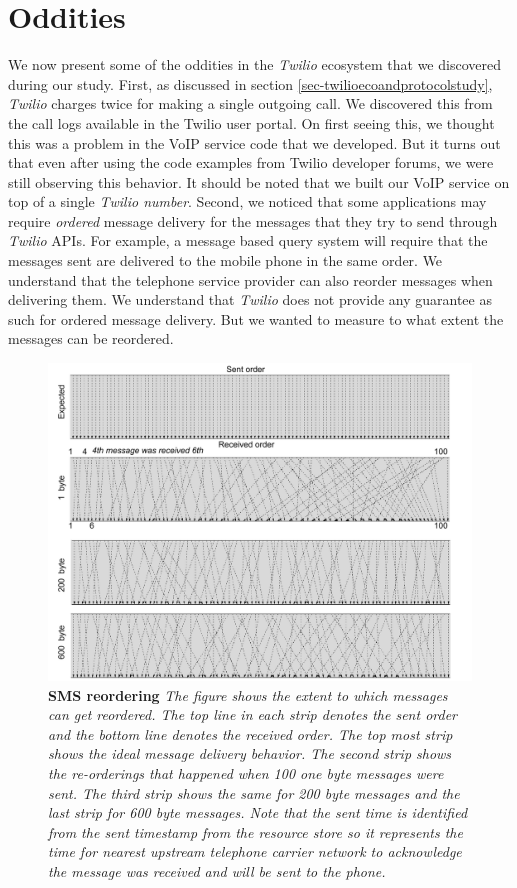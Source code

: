 \section{Oddities}
\label{sec-oddities}

We now present some of the oddities in the \textit{Twilio} ecosystem that we discovered during our study. First, as discussed in section \ref{sec-twilioecoandprotocolstudy}, \textit{Twilio} charges twice for making a single outgoing call. We discovered this from the call logs available in the Twilio user portal. On first seeing this, we thought this was a problem in the VoIP service code that we developed. But it turns out that even after using the code examples from Twilio developer forums, we were still observing this behavior. It should be noted that we built our VoIP service on top of a single \textit{Twilio number}. Second, we noticed that some applications may require \textit{ordered} message delivery for the messages that they try to send through \textit{Twilio} APIs. For example, a message based query system will require that the messages sent are delivered to the mobile phone in the same order. We understand that the telephone service provider can also reorder messages when delivering them. We understand that \textit{Twilio} does not provide any guarantee as such for ordered message delivery. But we wanted to measure to what extent the messages can be reordered. 

\begin{figure}[t!] \centering
\includegraphics[width=\textwidth]{figs/reordering.pdf}
\caption{\textbf{SMS reordering} {\footnotesize\textit{
The figure shows the extent to which messages can get reordered. The top line in each strip denotes the sent order and the bottom line denotes the received order. The top most strip shows the ideal message delivery behavior. The second strip shows the re-orderings that happened when 100 one byte messages were sent. The third strip shows the same for 200 byte messages and the last strip for 600 byte messages. Note that the sent time is identified from the \textit{sent timestamp} from the resource store so it represents the time for nearest upstream telephone carrier network to acknowledge the message was received and will be sent to the phone. 
}}}
\label{fig:reordering}
\end{figure}


